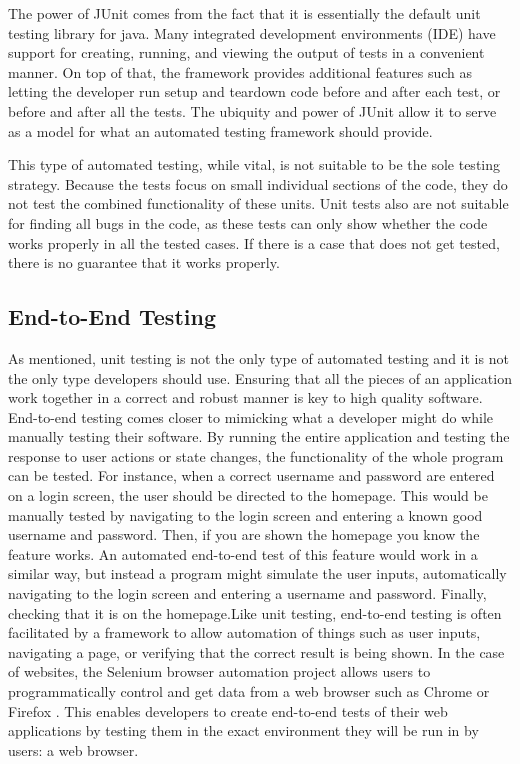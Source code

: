 \documentclass{article}
\begin{document}
\begin{onehalfspacing}
The power of JUnit comes from the fact that it is essentially the
default unit testing library for java. Many integrated development
environments (IDE) have support for creating, running, and viewing the
output of tests in a convenient manner. On top of that, the framework
provides additional features such as letting the developer run setup and
teardown code before and after each test, or before and after all the
tests. The ubiquity and power of JUnit allow it to serve as a model for
what an automated testing framework should provide.

This type of automated testing, while vital, is not suitable to be the
sole testing strategy. Because the tests focus on small individual
sections of the code, they do not test the combined functionality of
these units. Unit tests also are not suitable for finding all bugs in
the code, as these tests can only show whether the code works properly
in all the tested cases. If there is a case that does not get tested,
there is no guarantee that it works properly.

\subsection{End-to-End Testing}

As mentioned, unit testing is not the only type of automated testing and
it is not the only type developers should use. Ensuring that all the
pieces of an application work together in a correct and robust manner is
key to high quality software. End-to-end testing comes closer to
mimicking what a developer might do while manually testing their
software. By running the entire application and testing the response to
user actions or state changes, the functionality of the whole program
can be tested. For instance, when a correct username and password are
entered on a login screen, the user should be directed to the homepage.
This would be manually tested by navigating to the login screen and
entering a known good username and password. Then, if you are shown the
homepage you know the feature works. An automated end-to-end test of
this feature would work in a similar way, but instead a program might
simulate the user inputs, automatically navigating to the login screen
and entering a username and password. Finally, checking that it is on
the homepage.Like unit testing, end-to-end testing is often facilitated
by a framework to allow automation of things such as user inputs,
navigating a page, or verifying that the correct result is being shown.
In the case of websites, the Selenium browser automation project allows
users to programmatically control and get data from a web browser such
as Chrome or Firefox \parencite{seleniumproject}. 
This enables developers
to create end-to-end tests of their web applications by testing them in
the exact environment they will be run in by users: a web browser.


\end{onehalfspacing}
\end{document}
